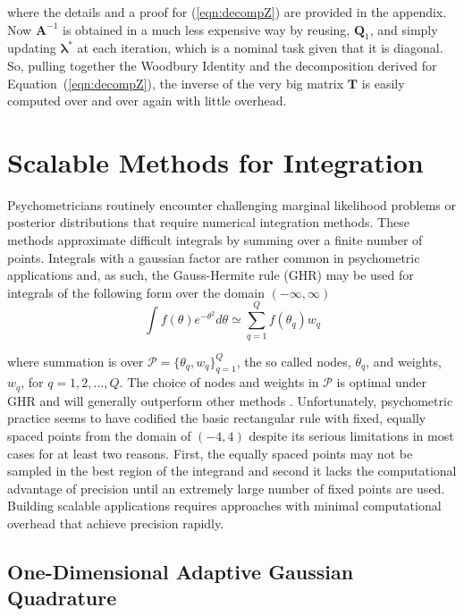 \documentclass[12pt]{article}
\begin{document}
\noindent where the details and a proof for (\ref{eqn:decompZ}) are provided in the appendix. Now $\bm{A}^{-1}$ is obtained in a much less expensive way by reusing, $\bm{Q}_1$, and simply updating $\bm{\lambda}^*$ at each iteration, which is a nominal task given that it is diagonal. So, pulling together the Woodbury Identity and the decomposition derived for Equation~(\ref{eqn:decompZ}), the inverse of the very big matrix $\bm{T}$ is easily computed over and over again with little overhead. 

\section*{Scalable Methods for Integration}

Psychometricians routinely encounter challenging marginal likelihood problems or posterior distributions that require numerical integration methods. These methods approximate difficult integrals by summing over a finite number of points. Integrals with a gaussian factor are rather common in psychometric applications and, as such, the Gauss-Hermite rule (GHR) may be used for integrals of the following form over the domain $(-\infty,\infty)$
\begin{equation}
\label{eqn:integral}
\int f(\theta)e^{-\theta^2} d\theta \simeq \sum_{q=1}^Q f(\theta_q)w_q
\end{equation}

\noindent where summation is over $\mathcal{P}=\{\theta_q,w_q\}^Q_{q=1}$, the so called nodes, $\theta_q$, and weights, $w_q$, for $q = 1,2, \ldots, Q$. The choice of nodes and weights in $\mathcal{P}$ is optimal under GHR and will generally outperform other methods \cite{Quarteroni}. Unfortunately, psychometric practice seems to have codified the basic rectangular rule with fixed, equally spaced points from the domain of $(-4,4)$ \cite{bock:eap} despite its serious limitations in most cases for at least two reasons. First, the equally spaced points may not be sampled in the best region of the integrand and second it lacks the computational advantage of precision until an extremely large number of fixed points are used. Building scalable applications requires approaches with minimal computational overhead that achieve precision rapidly. 

\subsection*{One-Dimensional Adaptive Gaussian Quadrature}
\end{document}
